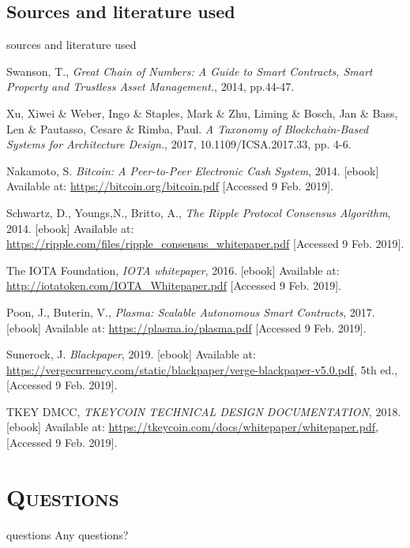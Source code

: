 \documentclass[xcolor=x11names,compress]{beamer}
\renewcommand{\(}{\begin{columns}}
\renewcommand{\)}{\end{columns}}
\newcommand{\<}[1]{\begin{column}{#1}}
\renewcommand{\>}{\end{column}}
\begin{document}
\subsection{Sources and literature used}
\begin{frame}{sources and literature used}
\begin{thebibliography}{1}
\tiny
{}
Swanson, T., \emph{Great Chain of Numbers: A Guide to Smart Contracts,
Smart Property and Trustless Asset Management.}, 2014, pp.44-47.

Xu, Xiwei \& Weber, Ingo \& Staples, Mark \& Zhu, Liming \& Bosch, Jan \& Bass,
Len \& Pautasso, Cesare \& Rimba, Paul. \emph{A Taxonomy of Blockchain-Based Systems for
Architecture Design.}, 2017, 10.1109/ICSA.2017.33, pp. 4-6.

Nakamoto, S. \emph{Bitcoin: A Peer-to-Peer Electronic Cash System}, 2014.
[ebook] Available at: \url{https://bitcoin.org/bitcoin.pdf} [Accessed 9 Feb. 2019].

Schwartz, D., Youngs,N., Britto, A., \emph{The Ripple Protocol Consensus Algorithm}, 2014.
[ebook] Available at: \url{https://ripple.com/files/ripple_consensus_whitepaper.pdf} [Accessed 9 Feb. 2019].

The IOTA Foundation, \emph{IOTA whitepaper}, 2016.
[ebook] Available at: \url{http://iotatoken.com/IOTA_Whitepaper.pdf} [Accessed 9 Feb. 2019].

Poon, J., Buterin, V., \emph{Plasma: Scalable Autonomous Smart Contracts}, 2017.
[ebook] Available at: \url{https://plasma.io/plasma.pdf} [Accessed 9 Feb. 2019].

Sunerock, J. \emph{Blackpaper}, 2019.
[ebook] Available at: \url{https://vergecurrency.com/static/blackpaper/verge-blackpaper-v5.0.pdf}, 5th ed., [Accessed 9 Feb. 2019].

TKEY DMCC, \emph{TKEYCOIN TECHNICAL DESIGN DOCUMENTATION}, 2018.
[ebook] Available at: \url{https://tkeycoin.com/docs/whitepaper/whitepaper.pdf}, [Accessed 9 Feb. 2019].
\end{thebibliography}
\end{frame}


\section{\scshape Questions}
\begin{frame}{questions}
Any questions?
\end{frame}
\end{document}
